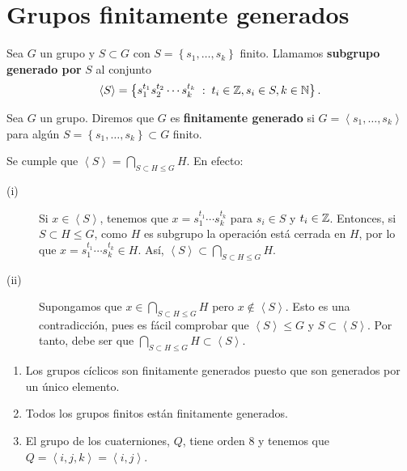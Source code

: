 \section{Grupos finitamente generados}
\begin{definition}
	Sea $\displaystyle G $ un grupo y $\displaystyle S \subset G $ con $\displaystyle S = \left\{ s _{1}, \ldots, s_{k}\right\}  $ finito. Llamamos \textbf{subgrupo generado por} $\displaystyle S $ al conjunto 
	\[\left\langle S \right\rangle = \left\{ s_{1}^{t_{1}}s_{2}^{t_{2}} \cdots s_{k}^{t_{k}} \; : \; t_{i} \in \mathbb{Z}, s_{i} \in S, k \in \mathbb{N}\right\}  .\]
\end{definition}
\begin{definition}
	Sea $\displaystyle G $ un grupo. Diremos que $\displaystyle G $ es \textbf{finitamente generado} si $\displaystyle G = \left\langle s_{1}, \ldots, s_{k} \right\rangle  $ para algún $\displaystyle S = \left\{ s_{1}, \ldots, s_{k}\right\} \subset G $ finito. 
\end{definition}
\begin{observation}
Se cumple que $\displaystyle \left\langle S \right\rangle  = \bigcap_{S \subset H \leq G}H $. En efecto:
\begin{description}
\item[(i)] Si $\displaystyle x \in \left\langle S \right\rangle  $, tenemos que $\displaystyle x = s_{1}^{t_{1}} \cdots s_{k}^{t_{k}} $ para $\displaystyle s_{i} \in S $ y $\displaystyle t_{i} \in \mathbb{Z} $. Entonces, si $\displaystyle S \subset H \leq G $, como $\displaystyle H $ es subgrupo la operación está cerrada en $\displaystyle H $, por lo que $\displaystyle x = s_{1}^{t_{1}} \cdots s_{k}^{t_{k}} \in H $. Así, $\displaystyle \left\langle S \right\rangle \subset \bigcap_{S \subset H \leq G}H $.
\item[(ii)] Supongamos que $\displaystyle x \in \bigcap_{S \subset H \leq G}H $ pero $\displaystyle x \not\in \left\langle S \right\rangle  $. Esto es una contradicción, pues es fácil comprobar que $\displaystyle \left\langle S \right\rangle \leq G $ y $\displaystyle S \subset \left\langle S \right\rangle  $. Por tanto, debe ser que $\displaystyle \bigcap_{S \subset H \leq G}H \subset \left\langle S \right\rangle  $.
\end{description}
\end{observation}
\begin{eg}
\begin{enumerate}
\item Los grupos cíclicos son finitamente generados puesto que son generados por un único elemento. 
\item Todos los grupos finitos están finitamente generados. 
\item El grupo de los cuaterniones, $\displaystyle Q $, tiene orden 8 y tenemos que $\displaystyle Q = \left\langle i, j, k \right\rangle =\left\langle i,j \right\rangle  $. 
\end{enumerate}
\end{eg}
